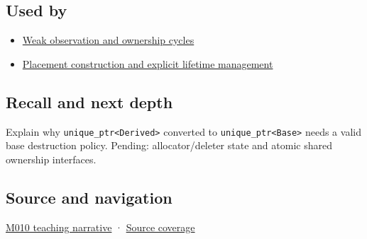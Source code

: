 \subsection{Used by}\label{appendix-51602cabe815-used-by}

\begin{itemize}
\tightlist
\item
  \hyperref[appendix-b9548675eb2b]{Weak observation and ownership cycles}
\item
  \hyperref[appendix-f56c3e43fd4e]{Placement construction and explicit lifetime management}
\end{itemize}

\subsection{Recall and next depth}\label{appendix-51602cabe815-recall-and-next-depth}

Explain why \texttt{unique\_ptr\textless{}Derived\textgreater{}} converted to \texttt{unique\_ptr\textless{}Base\textgreater{}} needs a valid base destruction policy. Pending: allocator/deleter state and atomic shared ownership interfaces.

\subsection{Source and navigation}\label{appendix-51602cabe815-source-and-navigation}

\hyperref[01-foundations-i-ch004-exclusive-ownership-unique_ptr-makes-transfer-visible]{M010 teaching narrative} · \hyperref[appendix-fd090d982a15-m010---parts-148-160]{Source coverage}
